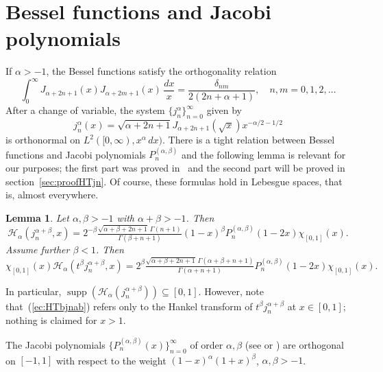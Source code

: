 \documentclass[12pt,leqno]{amsart}
\theoremstyle{plain}
\newtheorem{Lem}[Thm]{Lemma}
\newcommand{\supp}{\operatorname{supp}} %
\newcommand{\htra}{\mathcal{H}_\alpha} %
\newcommand{\ab}{{(\alpha,\beta)}} %
\begin{document}
\section{Bessel functions and Jacobi polynomials}
\label{sec:BfJp}

If $\alpha>-1$, the Bessel functions satisfy the orthogonality relation
\begin{equation*}
   \int_0^\infty  J_{\alpha +2n+1}(x) J_{\alpha +2m+1}(x)\,\frac{dx}{x}
     = \frac{\delta _{nm}}{2(2n+\alpha +1)},
   \quad n,m=0,1,2,\ldots
\end{equation*}
After a change of variable, the system $\{j_n^\alpha\}_{n=0}^\infty$ given by
\begin{equation*}
    j_n^\alpha(x)
      = \sqrt{\alpha+2n+1} J_{\alpha+2n+1}(\sqrt{x})
        x^{-\alpha/2-1/2}
\end{equation*}
is orthonormal on $L^2([0,\infty),x^\alpha\,dx)$. There is a tight relation
between Bessel functions and Jacobi polynomials $P^\ab_n$ and the following
lemma is relevant for our purposes; the first part was proved in~\cite{CGPV}
and the second part will be proved in section~\ref{sec:proofHTjn}. Of
course, these formulas hold in Lebesgue spaces, that is, almost everywhere.

\begin{Lem}
\label{lem:HTjn}
Let $\alpha, \beta>-1$ with $\alpha+\beta>-1$. Then
\begin{equation}
    \label{ec:HTjnab}
    \htra(j_n^{\alpha+\beta},x)
      = 2^{-\beta} \tfrac{\sqrt{\alpha+\beta+2n+1} \, \Gamma(n+1)}
        {\Gamma(\beta+n+1)}
        (1-x)^\beta P^\ab_n(1-2x) \chi_{[0,1]}(x).
\end{equation}
Assume further $\beta<1$. Then
\begin{equation}
    \label{ec:HTbjnab}
     \chi_{[0,1]}(x) \htra(t^{\beta}j_n^{\alpha+\beta},x)
      = 2^\beta \tfrac{\sqrt{\alpha+\beta+2n+1} \, \Gamma(\alpha+\beta+n+1)}
        {\Gamma(\alpha+n+1)} P^\ab_n(1-2x) \chi_{[0,1]}(x).
\end{equation}
\end{Lem}

In particular, $\supp (\htra(j^{\alpha+\beta}_n)) \subseteq [0,1]$.
However, note that~(\ref{ec:HTbjnab}) refers only to the Hankel transform
of $t^{\beta}j_n^{\alpha+\beta}$ at $x \in [0,1]$; nothing is claimed for
$x>1$.


The Jacobi polynomials $\{P^\ab_n(x)\}_{n=0}^\infty$ of order $\alpha,
\beta$ (see \cite[Ch.~X]{E-HTF} or \cite[Ch.~IV]{Sze}) are orthogonal
on $[-1,1]$ with respect to the weight $(1-x)^\alpha(1+x)^\beta$,
$\alpha,\beta>-1$.
\end{document}
